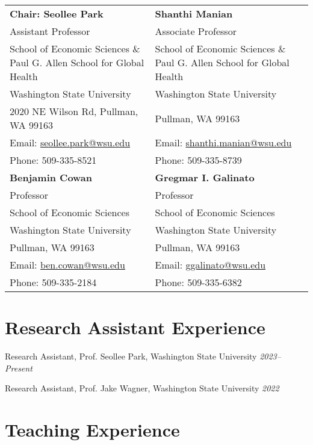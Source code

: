 \documentclass[11pt,letterpaper]{article}
\begin{document}
\begin{tabular}{p{} p{}}

\textbf{Chair: Seollee Park} & \textbf{Shanthi Manian} \\
Assistant Professor & Associate Professor \\
School of Economic Sciences \& Paul G. Allen School for Global Health & School of Economic Sciences \& Paul G. Allen School for Global Health \\
Washington State University & Washington State University \\
2020 NE Wilson Rd, Pullman, WA 99163 & Pullman, WA 99163 \\
Email: \href{mailto:seollee.park@wsu.edu}{seollee.park@wsu.edu} & Email: \href{mailto:shanthi.manian@wsu.edu}{shanthi.manian@wsu.edu} \\
Phone: 509-335-8521 & Phone: 509-335-8739 \\[1em]

\textbf{Benjamin Cowan} & \textbf{Gregmar I. Galinato} \\
Professor & Professor \\
School of Economic Sciences & School of Economic Sciences \\
Washington State University & Washington State University \\
Pullman, WA 99163 & Pullman, WA 99163 \\
Email: \href{mailto:ben.cowan@wsu.edu}{ben.cowan@wsu.edu} & Email: \href{mailto:ggalinato@wsu.edu}{ggalinato@wsu.edu} \\
Phone: 509-335-2184 & Phone: 509-335-6382 \\

\end{tabular}

\section{Research Assistant Experience}

Research Assistant, Prof. Seollee Park, Washington State University \hfill \textit{2023–Present}

Research Assistant, Prof. Jake Wagner, Washington State University \hfill \textit{2022}

\section{Teaching Experience}
\end{document}
